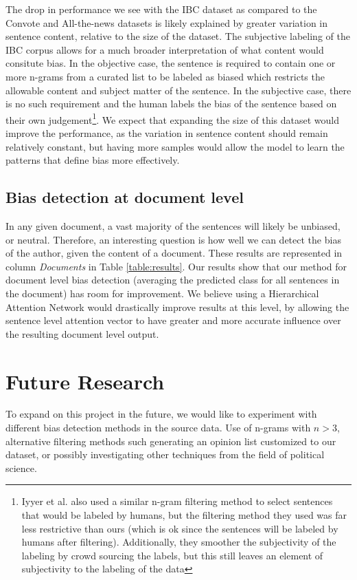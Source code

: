 \documentclass[10pt,a4paper,onecolumn]{article}
\begin{document}
The drop in performance we see with the IBC dataset as compared to the Convote and All-the-news datasets is likely explained by greater variation in sentence content, relative to the size of the dataset. The subjective labeling of the IBC corpus allows for a much broader interpretation of what content would consitute bias. In the objective case, the sentence is required to contain one or more n-grams from a curated list to be labeled as biased which restricts the allowable content and subject matter of the sentence. In the subjective case, there is no such requirement and the human labels the bias of the sentence based on their own judgement\footnote{Iyyer et al. also used a similar n-gram filtering method to select sentences that would be labeled by humans, but the filtering method they used was far less restrictive than ours (which is ok since the sentences will be labeled by humans after filtering). Additionally, they smoother the subjectivity of the labeling by crowd sourcing the labels, but this still leaves an element of subjectivity to the labeling of the data}. We expect that expanding  the size of this dataset would improve the performance, as the variation in sentence content should remain relatively constant, but having more samples would allow the model to learn the patterns that define bias more effectively.

\subsection{Bias detection at document level} 
In any given document, a vast majority of the sentences will likely be unbiased, or neutral. Therefore, an interesting question is how well we can detect the bias of the author, given the content of a document. These results are represented in column \textit{Documents} in Table \ref{table:results}. Our results show that our method for document level bias detection (averaging the predicted class for all sentences in the document) has room for improvement. We believe using a Hierarchical Attention Network would drastically improve results at this level, by allowing the sentence level attention vector to have greater and more accurate influence over the resulting document level output. 

\section*{Future Research}
To expand on this project in the future, we would like to experiment with different bias detection methods in the source data. Use of n-grams with $ n > 3 $, alternative filtering methods such generating an opinion list customized to our dataset, or possibly investigating other techniques from the field of political science.
\end{document}
